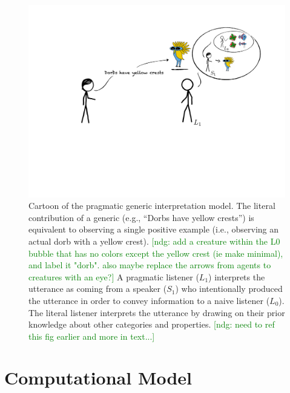 \documentclass[floatsintext,doc]{apa6}
\newcommand{\ndg}[1]{{\textcolor{Green}{[ndg: #1]}}}
\begin{document}
\begin{figure}
\centering
\includegraphics{figs/cartoon.pdf}
\caption{\label{fig:cartoon}Cartoon of the pragmatic generic interpretation model. The literal contribution of a generic (e.g., \enquote{Dorbs have yellow crests}) is equivalent to observing a single positive example (i.e., observing an actual dorb with a yellow crest). \ndg{add a creature within the L0 bubble that has no colors except the yellow crest (ie make minimal), and label it "dorb". also maybe replace the arrows from agents to creatures with an eye?} A pragmatic listener (\(L_1\)) interprets the utterance as coming from a speaker (\(S_1\)) who intentionally produced the utterance in order to convey information to a naive listener (\(L_0\)). The literal listener interprets the utterance by drawing on their prior knowledge about other categories and properties.
\ndg{need to ref this fig earlier and more in text...}}
\end{figure}

\hypertarget{computational-model}{%
\section{Computational Model}\label{computational-model}}
\end{document}
